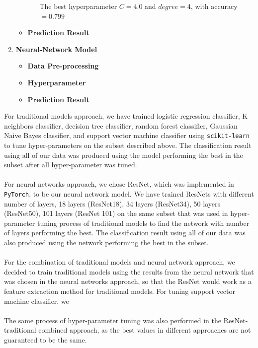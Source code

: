 \documentclass[11.5pt]{article}
\begin{document}
\begin{enumerate}
\begin{itemize}
\begin{enumerate}
                The best hyperparameter $C = 4.0$ and $degree = 4$, with accuracy $= 0.799$

                \begin{figure}

                \end{figure}

            \end{enumerate}
            \item \textbf{Prediction Result}
        \end{itemize}
        \item \textbf{Neural-Network Model}
        \begin{itemize}
            \item \textbf{Data Pre-processing}
            \item \textbf{Hyperparameter}
            \item \textbf{Prediction Result}
        \end{itemize}
    \end{enumerate}
    For traditional models approach, we have trained logistic regression classifier, K neighbors classifier, decision tree classifier, random forest classifier, Gaussian Naive Bayes classifier, and support vector machine classifier using \texttt{scikit-learn} to tune hyper-parameters on the subset described above.
    The classification result using all of our data was produced using the model performing the best in the subset after all hyper-parameter was tuned.\\ \\
    For neural networks approach, we chose ResNet, which was implemented in \texttt{PyTorch}, to be our neural network model.
    We have trained ResNets with different number of layers, 18 layers (ResNet18), 34 layers (ResNet34), 50 layers (ResNet50), 101 layers (ResNet 101) on the same subset that was used in hyper-parameter tuning process of traditional models to find the network with number of layers performing the best.
    The classification result using all of our data was also produced using the network performing the best in the subset.\\ \\
    For the combination of traditional models and neural network approach, we decided to train traditional models using the results from the neural network that was chosen in the neural networks approach, so that the ResNet would work as a feature extraction method for traditional models.
    For tuning support vector machine classifier, we \\ \\
    The same process of hyper-parameter tuning was also performed in the ResNet-traditional combined approach, as the best values in different approaches are not guaranteed to be the same.
\end{document}
